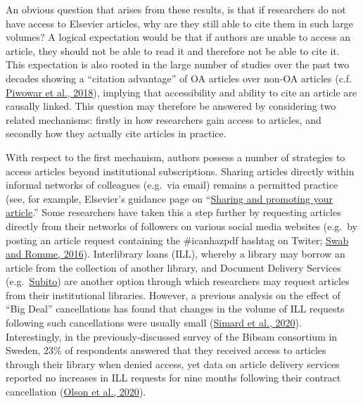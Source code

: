 \documentclass[
]{article}
\begin{document}
An obvious question that arises from these results, is that if researchers do not have access to Elsevier articles, why are they still able to cite them in such large volumes? A logical expectation would be that if authors are unable to access an article, they should not be able to read it and therefore not be able to cite it. This expectation is also rooted in the large number of studies over the past two decades showing a ``citation advantage'' of OA articles over non-OA articles (c.f. \href{https://doi.org/10.7717/peerj.4375}{Piwowar et al., 2018}), implying that accessibility and ability to cite an article are causally linked. This question may therefore be answered by considering two related mechanisms: firstly in how researchers gain access to articles, and secondly how they actually cite articles in practice.

With respect to the first mechanism, authors possess a number of strategies to access articles beyond institutional subscriptions. Sharing articles directly within informal networks of colleagues (e.g.~via email) remains a permitted practice (see, for example, Elsevier's guidance page on ``\href{https://www.elsevier.com/authors/submit-your-paper/sharing-and-promoting-your-article}{Sharing and promoting your article}.'' Some researchers have taken this a step further by requesting articles directly from their networks of followers on various social media websites (e.g.~by posting an article request containing the \#icanhazpdf hashtag on Twiter; \href{https://doi.org/10.5596/c16-009}{Swab and Romme, 2016}). Interlibrary loans (ILL), whereby a library may borrow an article from the collection of another library, and Document Delivery Services (e.g.~\href{https://www.subito-doc.de/?lang=en}{Subito}) are another option through which researchers may request articles from their institutional libraries. However, a previous analysis on the effect of ``Big Deal'' cancellations has found that changes in the volume of ILL requests following such cancellations were usually small (\href{https://arxiv.org/abs/2009.04287}{Simard et al., 2020}). Interestingly, in the previously-discussed survey of the Bibsam consortium in Sweden, 23\% of respondents answered that they received access to articles through their library when denied access, yet data on article delivery services reported no increases in ILL requests for nine months following their contract cancellation (\href{http://doi.org/10.1629/uksg.507}{Olson et al., 2020}).
\end{document}
